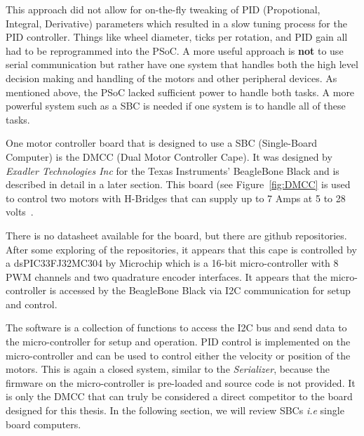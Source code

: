 \documentclass[12pt,oneside,final]{siuethesis}
\theoremstyle{definition}
\begin{document}
This approach did not allow for on-the-fly tweaking of PID (Propotional, Integral, Derivative) parameters which resulted in a slow tuning process for the PID controller. Things like wheel diameter, ticks per rotation, and PID gain all had to be reprogrammed into the PSoC. A more useful approach is \textbf{not} to use serial communication but rather have one system that handles both the high level decision making and handling of the motors and other peripheral devices. As mentioned above, the PSoC lacked sufficient power to handle both tasks. A more powerful system such as a SBC is needed if one system is to handle all of these tasks.


One motor controller board that is designed to use a SBC (Single-Board Computer) is the DMCC (Dual Motor Controller Cape).  It was designed by \emph{Exadler Technologies Inc} for the Texas Instruments' BeagleBone Black and is described in detail in a later section. This board (see Figure~\ref{fig:DMCC} is used to control two motors with H-Bridges that can supply up to 7 Amps at 5 to 28 volts~\cite{DMCC}. 

There is no datasheet available for the board, but there are github repositories. After some exploring of the repositories, it appears that this cape is controlled by a dsPIC33FJ32MC304 by Microchip which is a 16-bit micro-controller with 8 PWM channels and two quadrature encoder interfaces. It appears that the micro-controller is accessed by the BeagleBone Black via I2C communication for setup and control. 

The software is a collection of functions to access the I2C bus and send data to the micro-controller for setup and operation. PID control is implemented on the micro-controller and can be used to control either the velocity or position of the motors. This is again a closed system, similar to the \emph{Serializer}, because the firmware on the micro-controller is pre-loaded and source code is not provided. It is only the DMCC that can truly be considered a direct competitor to the board designed for this thesis.  In the following section, we will review SBCs \emph{i.e} single board computers.\\
\end{document}
